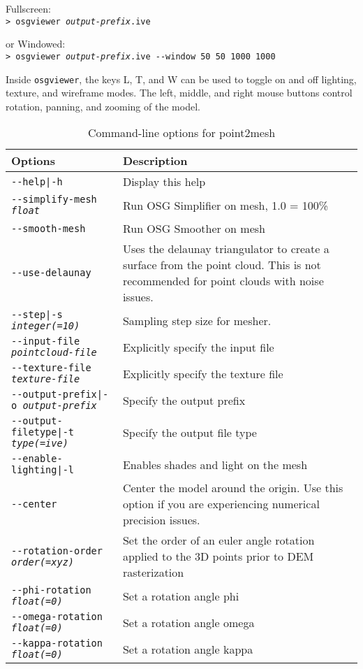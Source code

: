 \hspace*{2em}Fullscreen:\\
\hspace*{2em}\texttt{> osgviewer \textit{output-prefix}.ive}

\hspace*{2em}or Windowed:\\
\hspace*{2em}\texttt{> osgviewer \textit{output-prefix}.ive -\/-window 50 50 1000 1000}

Inside \texttt{osgviewer}, the keys L, T, and W can be used to toggle on
and off lighting, texture, and wireframe modes.  The left, middle, and
right mouse buttons control rotation, panning, and zooming of the
model.

\begin{longtable}{|l|p{10cm}|}
\caption{Command-line options for point2mesh}
\label{tbl:point2mesh}
\endfirsthead
\endhead
\endfoot
\endlastfoot
\hline
Options & Description \\ \hline \hline
\texttt{-\/-help|-h} & Display this help \\ \hline
\texttt{-\/-simplify-mesh \textit{float}} & Run OSG Simplifier on mesh, 1.0 = 100\% \\ \hline
\texttt{-\/-smooth-mesh} & Run OSG Smoother on mesh \\ \hline
\texttt{-\/-use-delaunay} & Uses the delaunay triangulator to create a surface from the point cloud. This is not recommended for point clouds with noise issues. \\ \hline
\texttt{-\/-step|-s \textit{integer(=10)}} & Sampling step size for mesher. \\ \hline
\texttt{-\/-input-file \textit{pointcloud-file}} & Explicitly specify the input file \\ \hline
\texttt{-\/-texture-file \textit{texture-file}} & Explicitly specify the texture file \\ \hline
\texttt{-\/-output-prefix|-o \textit{output-prefix}} & Specify the output prefix \\ \hline
\texttt{-\/-output-filetype|-t \textit{type(=ive)}} & Specify the output file type \\ \hline
\texttt{-\/-enable-lighting|-l} & Enables shades and light on the mesh \\ \hline
\texttt{-\/-center} & Center the model around the origin. Use this option if you are experiencing numerical precision issues. \\ \hline
\texttt{-\/-rotation-order \textit{order(=xyz)}} & Set the order of an euler angle rotation applied to the 3D points prior to DEM rasterization \\ \hline
\texttt{-\/-phi-rotation \textit{float(=0)}} & Set a rotation angle phi \\ \hline
\texttt{-\/-omega-rotation \textit{float(=0)}} & Set a rotation angle omega \\ \hline
\texttt{-\/-kappa-rotation \textit{float(=0)}} & Set a rotation angle kappa \\ \hline
\end{longtable}

